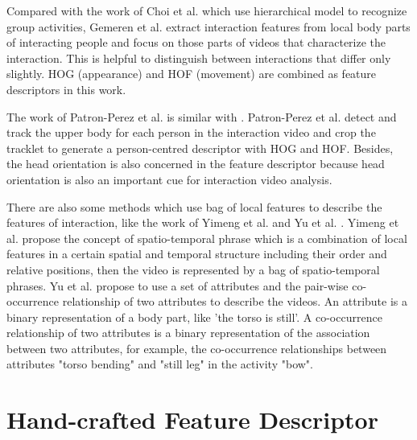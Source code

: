 Compared with the work of Choi et al. which use hierarchical model to recognize group activities, Gemeren et al. \cite{Gemeren2015} extract interaction features from local body parts of interacting people and focus on those parts of videos that characterize the interaction. This is helpful to distinguish between interactions that differ only slightly. HOG (appearance) and HOF (movement) are combined as feature descriptors in this work.
\par
The work of Patron-Perez et al. \cite{patron2010} is similar with \cite{Gemeren2015}. Patron-Perez et al. detect and track the upper body for each person in the interaction video and crop the tracklet to generate a person-centred descriptor with HOG and HOF. Besides, the head orientation is also concerned in the feature descriptor because head orientation is also an important cue for interaction video analysis.
\par
There are also some methods which use bag of local features to describe the features of interaction, like the work of Yimeng et al. \cite{yimeng} and Yu et al. \cite{yu}. Yimeng et al. propose the concept of spatio-temporal phrase which is a combination of local features in a certain spatial and temporal structure including their order and relative positions, then the video is represented by a bag of spatio-temporal phrases. Yu et al. propose to use a set of attributes and the pair-wise co-occurrence relationship of two attributes to describe the videos. An attribute is a binary representation of a body part, like 'the torso is still'. A co-occurrence relationship of two attributes is a binary representation of the association between two attributes, for example, the co-occurrence relationships between attributes "torso bending" and "still leg" in the activity "bow". 

 

\section{Hand-crafted Feature Descriptor}
\label{2_2}

